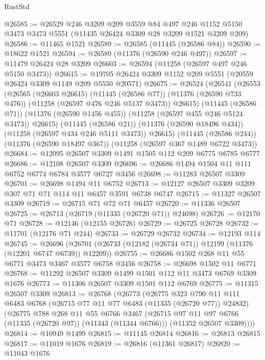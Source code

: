 \begin{lexlean}{RustStd}
\begin{coremodule}
{\begin{coremodule}
{{{{{{{{{{{{{{{{{{{{{{{{{{{{{{{{{{{{{{{{{{{{{{{{{{{{{{{{{{{{{{{{{{{{{{{{{{{{{{{{{{{{{@26585 := @26529
    @246
    @3209
    @209
    @3559
    @84
    @497
    @246
    @1152
    @5150
    @3473
    @3473
    @5551
    (@11435 @26424 @3309 @28 @3209 @1521 @3209 @209)
@26586 := @11465 @1521
@26589 := @26585 (@11445 (@26586 @84))
@26590 := @18622 @1521
@26594 := @26589 (@11376 (@26590 @246 @497))
@26597 := @11479 @26424 @28 @3209
@26603 := @26594 (@11258 (@26597 @497 @246 @5150 @3473))
@26615 := @19705 @26424 @3309 @1152 @209 @5551 (@20559 @26424 @3309 @1149 @209 @5550 @20571)
@26675 := @26524
    (@26541
      (@26553
        (@26565
          (@26603 @26615)
          (@11445 (@26586 @77))
          (@11376 (@26590 @733 @476))
          (@11258 (@26597 @476 @246 @5137 @3473))
          @26615)
        (@11445 (@26586 @71))
        (@11376 (@26590 @1456 @455))
        (@11258 (@26597 @455 @246 @5124 @3473))
        @26615)
      (@11445 (@26586 @21))
      (@11376 (@26590 @18496 @434))
      (@11258 (@26597 @434 @246 @5111 @3473))
      @26615)
    (@11445 (@26586 @244))
    (@11376 (@26590 @18497 @367))
    (@11258 (@26597 @367 @1489 @6722 @3473))
@26684 := @12095 @26507 @3309 @1491 @1505 @112 @209 @6775 @6785 @6777
@26686 := @12108 @26507 @3309
@26696 := @26686 @1494 @1504 @11 @111 @6752 @6774 @6784 @3577 @6727 @3456
@26698 := @11283 @26507 @3309
@26701 := @26698 @1494 @11 @6752
@26713 := @12127 @26507 @3309 @3209 @307 @71 @71 @114 @11 @6457 @3591 @6738 @6747
@26715 := @11327 @26507 @3309
@26719 := @26715 @71 @72 @71 @6457
@26720 := @11336 @26507
@26725 := @26713 (@26719 (@11335 (@26720 @71)) @24698)
@26726 := @12170 @71
@26728 := @12146 (@12155 @26726)
@26729 := @26725 @26728
@26732 := @11701 (@12176 @71 @244)
@26733 := @26729 @26732
@26734 := @12193 @114
@26745 := @26696 (@26701 (@26733 (@12182 (@26734 @71)) @12199 (@11376 (@12201 @6747 @6739)) @12209))
@26755 := @26686 @1502 @268 @11 @55 @6771 @3473 @3467 @3577 @6758 @3456
@26758 := @26698 @1502 @11 @6771
@26768 := @11292 @26507 @3309 @1499 @1501 @112 @11 @3473 @6769 @3309 @1676
@26773 := @11306 @26507 @3309 @1501 @112 @6769
@26775 := @11315 @26507 @3309
@26813 := @26768
    (@26773
      (@26775
        @323
        @790
        @11
        @111
        @6483
        @6768
        (@26715 @77 @11 @77 @6483 (@11335 (@26720 @77)) @24832)
        (@26775
          @788
          @268
          @11
          @55
          @6766
          @3467
          (@26715 @97 @11 @97 @6766 (@11335 (@26720 @97)) (@11343 (@11344 @6766)))
          (@11352 @26507 @3309))))
@26814 := @10949 @1499
@26815 := @11145 @26814
@26816 := @26813 @26815
@26817 := @11019 @1676
@26819 := @26816 (@11361 @26817)
@26820 := @11043 @1676
}}}}}}}}}}}}}}}}}}}}}}}}}}}}}}}}}}}}}}}}}}}}}}}}}}}}}}}}}}}}}}}}}}}}}}}}}}}}}}}}}}}}}
\end{coremodule}}
\end{coremodule}
\end{lexlean}
